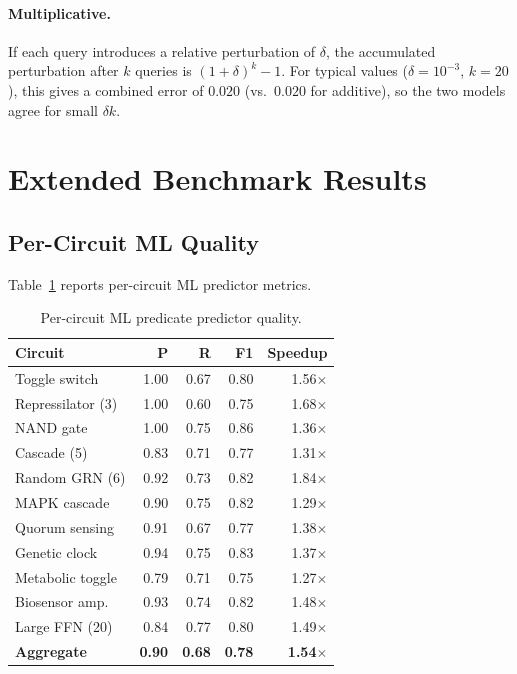 \documentclass[11pt]{article}
\begin{document}
\paragraph{Multiplicative.} If each query introduces a relative
perturbation of $\delta$, the accumulated perturbation after $k$
queries is $(1+\delta)^k - 1$. For typical values ($\delta = 10^{-3}$,
$k = 20$), this gives a combined error of $0.020$ (vs.\ $0.020$ for
additive), so the two models agree for small $\delta k$.

\section{Extended Benchmark Results}
\label{app:extended}

\subsection{Per-Circuit ML Quality}

Table~\ref{tab:ml-extended} reports per-circuit ML predictor metrics.

\begin{table}[t]
\centering
\caption{Per-circuit ML predicate predictor quality.}
\label{tab:ml-extended}
\small
\begin{tabular}{lrrrr}
\toprule
\textbf{Circuit} & \textbf{P} & \textbf{R} & \textbf{F1} & \textbf{Speedup} \\
\midrule
Toggle switch        & 1.00 & 0.67 & 0.80 & 1.56$\times$ \\
Repressilator (3)    & 1.00 & 0.60 & 0.75 & 1.68$\times$ \\
NAND gate            & 1.00 & 0.75 & 0.86 & 1.36$\times$ \\
Cascade (5)          & 0.83 & 0.71 & 0.77 & 1.31$\times$ \\
Random GRN (6)       & 0.92 & 0.73 & 0.82 & 1.84$\times$ \\
MAPK cascade         & 0.90 & 0.75 & 0.82 & 1.29$\times$ \\
Quorum sensing       & 0.91 & 0.67 & 0.77 & 1.38$\times$ \\
Genetic clock        & 0.94 & 0.75 & 0.83 & 1.37$\times$ \\
Metabolic toggle     & 0.79 & 0.71 & 0.75 & 1.27$\times$ \\
Biosensor amp.       & 0.93 & 0.74 & 0.82 & 1.48$\times$ \\
Large FFN (20)       & 0.84 & 0.77 & 0.80 & 1.49$\times$ \\
\midrule
\textbf{Aggregate}   & \textbf{0.90} & \textbf{0.68} & \textbf{0.78} &
  \textbf{1.54}$\times$ \\
\bottomrule
\end{tabular}
\end{table}
\end{document}
